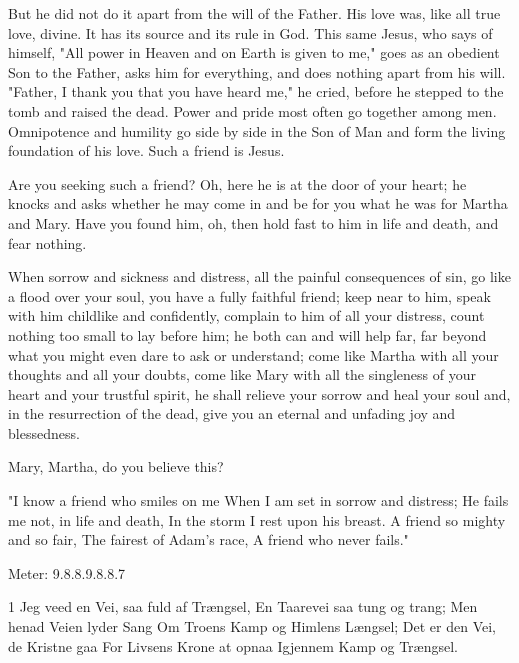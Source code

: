 But he did not do it apart from the will of the Father. His love was, like all true love, divine. It has its source and its rule in God. This same Jesus, who says of himself, "All power in Heaven and on Earth is given to me," goes as an obedient Son to the Father, asks him for everything, and does nothing apart from his will. "Father, I thank you that you have heard me," he cried, before he stepped to the tomb and raised the dead. Power and pride most often go together among men. Omnipotence and humility go side by side in the Son of Man and form the living foundation of his love. Such a friend is Jesus.

Are you seeking such a friend? Oh, here he is at the door of your heart; he knocks and asks whether he may come in and be for you what he was for Martha and Mary. Have you found him, oh, then hold fast to him in life and death, and fear nothing.

When sorrow and sickness and distress, all the painful consequences of sin, go like a flood over your soul, you have a fully faithful friend; keep near to him, speak with him childlike and confidently, complain to him of all your distress, count nothing too small to lay before him; he both can and will help far, far beyond what you might even dare to ask or understand; come like Martha with all your thoughts and all your doubts, come like Mary with all the singleness of your heart and your trustful spirit, he shall relieve your sorrow and heal your soul and, in the resurrection of the dead, give you an eternal and unfading joy and blessedness.

Mary, Martha, do you believe this?

"I know a friend who smiles on me
When I am set in sorrow and distress;
He fails me not, in life and death,
In the storm I rest upon his breast.
A friend so mighty and so fair,
The fairest of Adam’s race,
A friend who never fails."





Meter: 9.8.8.9.8.8.7




1 Jeg veed en Vei, saa fuld af Trængsel,
En Taarevei saa tung og trang;
Men henad Veien lyder Sang
Om Troens Kamp og Himlens Længsel;
Det er den Vei, de Kristne gaa
For Livsens Krone at opnaa
Igjennem Kamp og Trængsel.

